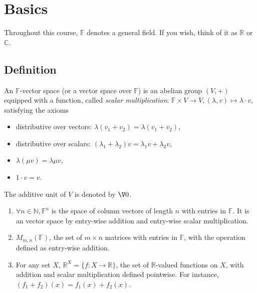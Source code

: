 \documentclass[a4paper]{article}
\theoremstyle{definition}
\begin{document}
\maketitle

\tableofcontents

\section{Basics}

\begin{convention}
  Throughout this course, $\mathbb{F}$ denotes a general field. If you wish, think of it as $\mathbb{R}$ or $\mathbb{C}$.
\end{convention}

\subsection{Definition}

\begin{defi}
  An $\mathbb{F}$-vector space (or a vector space over $\mathbb{F}$) is an abelian group $(V, +)$ equipped with a function, called \emph{scalar multiplication}: $\mathbb{F}\times V \to V, (\lambda, v) \mapsto \lambda\cdot v$, satisfying the axioms
  \begin{itemize}
  \item distributive over vectors: $\lambda(v_1+v_2) = \lambda(v_1+v_2)$,
  \item distributive over scalars: $(\lambda_1+\lambda_2)v= \lambda_1 v+\lambda_2 v$,
  \item $\lambda(\mu v) = \lambda \mu v$,
  \item $1\cdot v = v$.
  \end{itemize}
\end{defi}

The additive unit of $V$ is denoted by $\V 0$.

\begin{eg}\leavevmode
  \label{eg:matrix as V}
  \begin{enumerate}
  \item $\forall n \in \mathbb{N}, \mathbb{F}^n$ is the space of column vectors of length $n$ with entries in $\mathbb{F}$. It is an vector space by entry-wise addition and entry-wise scalar multiplication.
  \item $M_{m,n}(\mathbb{F})$, the set of $m\times n$ matrices with entries in $\mathbb{F}$, with the operation defined as entry-wise addition.
    \item For any set $X$, $\mathbb{R}^X = \{f: X \to \mathbb{R}\}$, the set of $\mathbb{R}$-valued functions on $X$, with addition and scalar multiplication defined pointwise. For instance, $(f_1+f_2)(x) = f_1(x)+f_2(x)$.
  \end{enumerate}
\end{eg}
\end{document}
